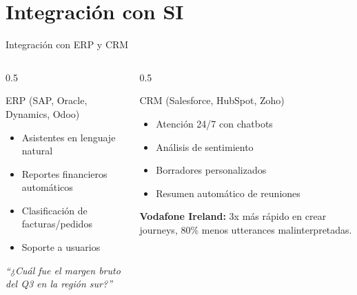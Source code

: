 \documentclass[10pt,aspectratio=169]{beamer}
\begin{document}
\section{Integración con SI}
\begin{frame}{Integración con ERP y CRM}
    \begin{columns}[T]
        \begin{column}{0.5\textwidth}
            \begin{block}{ERP (SAP, Oracle, Dynamics, Odoo)}
                \begin{itemize}
                    \item Asistentes en lenguaje natural
                    \item Reportes financieros automáticos
                    \item Clasificación de facturas/pedidos
                    \item Soporte a usuarios
                \end{itemize}
                \textit{``¿Cuál fue el margen bruto del Q3 en la región sur?''}
            \end{block}
        \end{column}
        \begin{column}{0.5\textwidth}
            \begin{block}{CRM (Salesforce, HubSpot, Zoho)}
                \begin{itemize}
                    \item Atención 24/7 con chatbots
                    \item Análisis de sentimiento
                    \item Borradores personalizados
                    \item Resumen automático de reuniones
                \end{itemize}
                \vspace{0.2cm}
                \textbf{Vodafone Ireland:} 3x más rápido en crear journeys, 80\% menos utterances malinterpretadas.
            \end{block}
        \end{column}
    \end{columns}
\end{frame}
\end{document}
